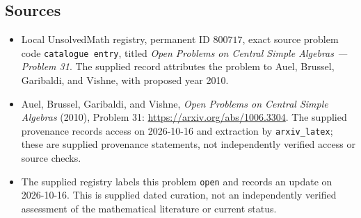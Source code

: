 \documentclass[11pt]{article}
\begin{document}
\subsection{Sources}
\begin{itemize}
\item Local UnsolvedMath registry, permanent ID \(800717\), exact source problem code \texttt{catalogue entry}, titled \emph{Open Problems on Central Simple Algebras --- Problem 31}. The supplied record attributes the problem to Auel, Brussel, Garibaldi, and Vishne, with proposed year 2010.
\item Auel, Brussel, Garibaldi, and Vishne, \emph{Open Problems on Central Simple Algebras} (2010), Problem 31: \url{https://arxiv.org/abs/1006.3304}. The supplied provenance records access on 2026-10-16 and extraction by \texttt{arxiv\_latex}; these are supplied provenance statements, not independently verified access or source checks.
\item The supplied registry labels this problem \texttt{open} and records an update on 2026-10-16. This is supplied dated curation, not an independently verified assessment of the mathematical literature or current status.
\end{itemize}
\end{document}

